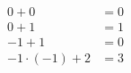 \documentclass[preview]{standalone}
\begin{document}
\begin{align*}
0+0 & = 0\\ 0+1 & = 1\\ -1 + 1 & = 0\\ -1\cdot (-1) + 2 & = 3
\end{align*}
\end{document}
